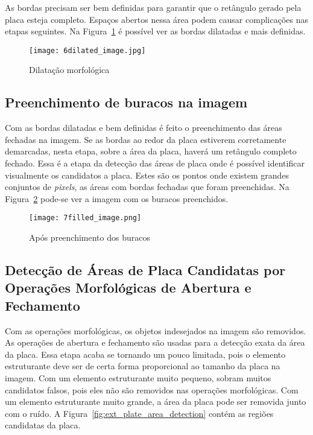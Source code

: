 As bordas precisam ser bem definidas para garantir que o retângulo gerado pela placa esteja completo. Espaços abertos nessa área podem causar complicações nas etapas seguintes. Na Figura~\ref{fig:ext_morphological_dilation} é possível ver as bordas dilatadas e mais definidas.

\begin{figure}[H]
	\centering
	\texttt{[image: 6dilated\_image.jpg]}
	\caption{Dilatação morfológica}
	\label{fig:ext_morphological_dilation}
\end{figure}

\subsection{Preenchimento de buracos na imagem}

Com as bordas dilatadas e bem definidas é feito o preenchimento das áreas fechadas na imagem. Se as bordas ao redor da placa estiverem corretamente demarcadas, nesta etapa, sobre a área da placa, haverá um retângulo completo fechado. Essa é a etapa da detecção das áreas de placa onde é possível identificar visualmente os candidatos a placa. Estes são os pontos onde existem grandes conjuntos de \emph{pixels}, as áreas com bordas fechadas que foram preenchidas. Na Figura~\ref{fig:ext_holes_filled} pode-se ver a imagem com os buracos preenchidos.

\begin{figure}[H]
	\centering
	\texttt{[image: 7filled\_image.png]}
	\caption{Após preenchimento dos buracos}
	\label{fig:ext_holes_filled}
\end{figure}

\subsection{Detecção de Áreas de Placa Candidatas por Operações Morfológicas de Abertura e Fechamento}

Com as operações morfológicas, os objetos indesejados na imagem são removidos. As operações de abertura e fechamento são usadas para a detecção exata da área da placa. Essa etapa acaba se tornando um pouco limitada, pois o elemento estruturante deve ser de certa forma proporcional ao tamanho da placa na imagem. Com um elemento estruturante muito pequeno, sobram muitos candidatos falsos, pois eles não são removidos nas operações morfológicas. Com um elemento estruturante muito grande, a área da placa pode ser removida junto com o ruído. A Figura~\ref{fig:ext_plate_area_detection} contém as regiões candidatas da placa.

